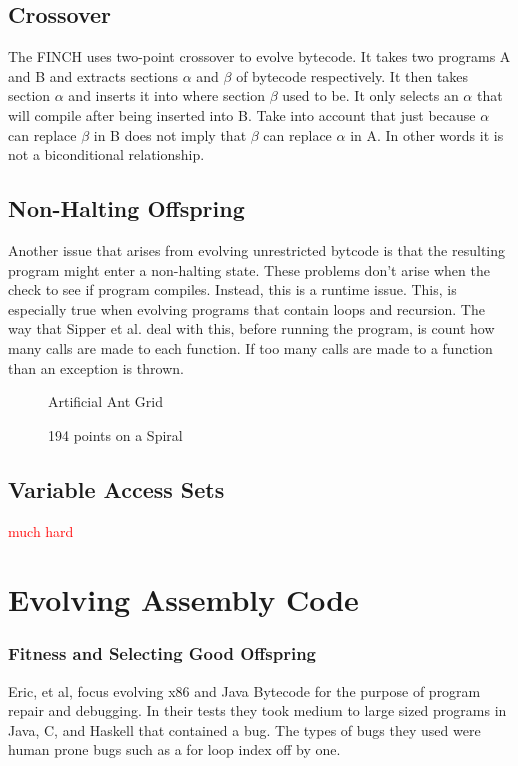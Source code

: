 \documentclass{sig-alternate}
\newcommand{\mycomment}[1]{\textcolor{red}{#1}}
\begin{document}
\subsection{Crossover}


The FINCH uses two-point crossover to evolve bytecode. It takes two programs A and B and extracts sections $\alpha$ and $\beta$ of bytecode respectively. It then takes section $\alpha$ and inserts it into where section $\beta$ used to be. It only selects an $\alpha$ that will compile after being inserted into B. Take into account that just because $\alpha$ can replace $\beta$ in B does not imply that $\beta$ can replace $\alpha$ in A. In other words it is not a biconditional relationship.

\subsection{Non-Halting Offspring}
Another issue that arises from evolving unrestricted bytcode is that the resulting program might enter a non-halting state. These problems don't arise when the check to see if program compiles. Instead, this is a runtime issue. This, is especially true when evolving programs that contain loops and recursion.
The way that Sipper et al.\cite{FINCH:2011} deal with this, before running the program, is count how many calls are made to each function. If too many calls are made to a function than an exception is thrown.


\begin{figure}
\centering
{}
\caption{Artificial Ant Grid}
\end{figure}

\begin{figure}
\centering
{}
\caption{194 points on a Spiral}
\end{figure}


\subsection{Variable Access Sets}
\cite{FINCH2:2009} \mycomment{much hard}


\section{Evolving Assembly Code}

\subsubsection{Fitness and Selecting Good Offspring } 
 Eric, et al, focus evolving x86 and Java Bytecode for the purpose of program repair and debugging. In their tests they took medium to large sized programs in Java, C, and Haskell that contained a bug. The types of bugs they used were human prone bugs such as a for loop index off by one.\par
\end{document}
